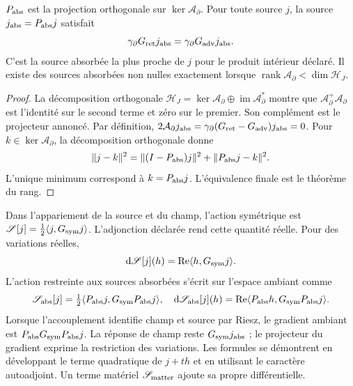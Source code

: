 \begin{theorem}
\label{vii:vii:thm:proyeccion-absorcion}
\(P_{\rm abs}\) est la projection orthogonale sur \(\ker\mathcal A_\partial\). Pour toute source \(j\), la source \(j_{\rm abs}=P_{\rm abs}j\) satisfait
\begin{equation}
 \gamma_\partial G_{\rm ret}j_{\rm abs}
 =\gamma_\partial G_{\rm adv}j_{\rm abs}.
 \label{vii:vii:eq:igualdad-borde-absorbido}
\end{equation}
C'est la source absorbée la plus proche de \(j\) pour le produit intérieur
déclaré. Il existe des sources absorbées non nulles exactement lorsque
\(\operatorname{rank}\mathcal A_\partial<\dim\mathcal H_J\).
\end{theorem}
\begin{proof}
La décomposition orthogonale
\(\mathcal H_J=\ker\mathcal A_\partial\oplus
 \operatorname{im}\mathcal A_\partial^*\) montre que
\(\mathcal A_\partial^+\mathcal A_\partial\) est l'identité
sur le second terme et zéro sur le premier. Son complément est le
projecteur annoncé. Par définition,
\(2\mathcal A_\partial j_{\rm abs}
 =\gamma_\partial(G_{\rm ret}-G_{\rm adv})j_{\rm abs}=0\).
Pour \(k\in\ker\mathcal A_\partial\), la décomposition orthogonale donne
\[
 \|j-k\|^2=\|(I-P_{\rm abs})j\|^2+\|P_{\rm abs}j-k\|^2.
\]
L'unique minimum correspond à \(k=P_{\rm abs}j\). L'équivalence finale est le théorème du rang.
\end{proof}

Dans l'appariement de la source et du champ, l'action symétrique est
\(\mathscr S[j]=\tfrac12\langle j,G_{\rm sym}j\rangle\).
L'adjonction déclarée rend cette quantité réelle. Pour des variations réelles,
\[
 \mathrm d\mathscr S[j](h)
 =\operatorname{Re}\langle h,G_{\rm sym}j\rangle.
\]
L'action restreinte aux sources absorbées s'écrit sur l'espace ambiant comme
\begin{equation}
 \mathscr S_{\rm abs}[j]
 =\tfrac12\langle P_{\rm abs}j,G_{\rm sym}P_{\rm abs}j\rangle,
 \quad
 \mathrm d\mathscr S_{\rm abs}[j](h)
 =\operatorname{Re}\langle P_{\rm abs}h,G_{\rm sym}P_{\rm abs}j\rangle.
 \label{vii:vii:eq:variacion-restringida-absorcion}
\end{equation}
Lorsque l'accouplement identifie champ et source par Riesz, le gradient ambiant est \(P_{\rm abs}G_{\rm sym}P_{\rm abs}j\). La réponse de champ reste \(G_{\rm sym}j_{\rm abs}\) ; le projecteur du gradient exprime la restriction des variations. Les formules se démontrent en développant le terme quadratique de \(j+th\) et en utilisant le caractère autoadjoint. Un terme matériel \(\mathscr S_{\rm matter}\) ajoute sa propre différentielle.

